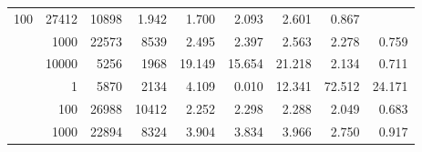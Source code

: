 \begin{table}
\begin{tabular}{rrrrrrrrr}
					\multirow{ 1 }{*}{ 100 } &
					
						
							    
							     27412  & 10898  
	                           & 1.942 & 1.700 & 2.093
	                           & 2.601 & 0.867  \\
	                
	            
					 &  
					 
					\multirow{ 1 }{*}{ 1000 } &
					
						
							    
							     22573  & 8539  
	                           & 2.495 & 2.397 & 2.563
	                           & 2.278 & 0.759  \\
	                
	            
					 &  
					 
					\multirow{ 1 }{*}{ 10000 } &
					
						
							    
							     5256  & 1968  
	                           & 19.149 & 15.654 & 21.218
	                           & 2.134 & 0.711  \\
	                
	            
	        
				\noalign{\smallskip}\hline
				\multirow{ 4 }{*}{ 250000 } &
				
					
					 
					\multirow{ 1 }{*}{ 1 } &
					
						
							    
							     5870  & 2134  
	                           & 4.109 & 0.010 & 12.341
	                           & 72.512 & 24.171  \\
	                
	            
					 &  
					 
					\multirow{ 1 }{*}{ 100 } &
					
						
							    
							     26988  & 10412  
	                           & 2.252 & 2.298 & 2.288
	                           & 2.049 & 0.683  \\
	                
	            
					 &  
					 
					\multirow{ 1 }{*}{ 1000 } &
					
						
							    
							     22894  & 8324  
	                           & 3.904 & 3.834 & 3.966
	                           & 2.750 & 0.917  \\
	                

\end{tabular}
\end{table}
